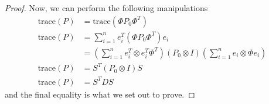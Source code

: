 \documentclass[10pt,a4paper]{article}
\begin{document}
\begin{proof}
Now, we can perform the following manipulations 
\begin{align}
\mathrm{trace}(P) &= \mathrm{trace}(\Phi P_0 \Phi^T) \\
\mathrm{trace}(P) &= \sum_{i=1}^{n} e_i^T (\Phi P_0 \Phi^T)e_i \\
&= \left(\sum_{i=1}^{n} e_i^T \otimes e_i^T\Phi^T\right)(P_0\otimes I)\left(\sum_{i=1}^{n} e_i \otimes \Phi e_i\right) \\
\mathrm{trace}(P) &= S^T(P_0\otimes I)S \\ 
\mathrm{trace}(P) &= S^TDS %
\end{align}
and the final equality is what we set out to prove. 
\end{proof}
\end{document}
